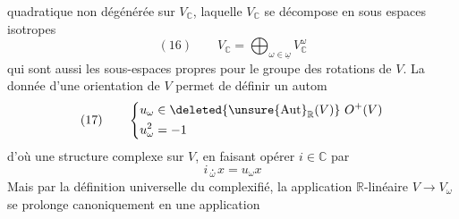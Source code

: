 quadratique non dégénérée sur $V_{\mathbb C}$,
 laquelle $V_{\mathbb C}$ se décompose en
sous espaces isotropes
\[
(16)\qquad V_{\mathbb C}=\bigoplus_{\omega\in\underline\omega}V_{\mathbb C}^{\omega}
\]
qui sont aussi les sous-espaces propres
pour le groupe  des rotations de $V$.
La donnée d’une orientation \inserted{$\omega$} de $V$
permet de définir un autom 
\[
(17)\qquad\left\{\begin{aligned}
&u_\omega\in\deleted{\unsure{\operatorname{Aut}}_{\mathbb R}(V)}\ O^+(V)\\
&u_\omega^2=-1
\end{aligned}\right.
\]
d’où une structure complexe sur
$V$, en faisant opérer $i\in\mathbb C$ par
\[
i\mathbin{\underset{\omega}{\cdot}}x=u_\omega x
\]
Mais par la définition universelle du
complexifié, la  application
$\mathbb R$-linéaire $V\longrightarrow V_\omega$ se prolonge
canoniquement en une application

